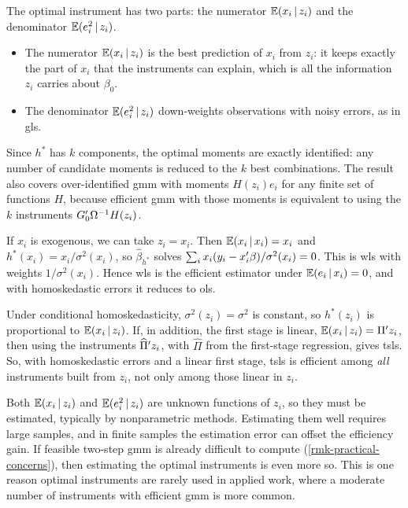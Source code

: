 \documentclass[a4paper,12pt]{article}
\begin{document}
\begin{remark}[Intuition]
	The optimal instrument has two parts: the numerator $\operatorname{\mathbb{E}}(x_i\mathpunct{}|\mathpunct{} z_i)$ and the denominator $\operatorname{\mathbb{E}}(e_i^2\mathpunct{}|\mathpunct{} z_i)$.
	\begin{itemize}
		\item
			The numerator $\operatorname{\mathbb{E}}(x_i\mathpunct{}|\mathpunct{} z_i)$ is the best prediction of $x_i$ from $z_i$:
			it keeps exactly the part of $x_i$ that the instruments can explain, which is all the information $z_i$ carries about $\beta_0$.
		\item
			The denominator $\operatorname{\mathbb{E}}(e_i^2\mathpunct{}|\mathpunct{} z_i)$ down-weights observations with noisy errors, as in \gls{gls}.
	\end{itemize}
	Since $h^*$ has $k$ components, the optimal moments are exactly identified:
	any number of candidate moments is reduced to the $k$ best combinations.
	The result also covers over-identified \gls{gmm} with moments $H(z_i)e_i$ for any finite set of functions $H$,
	because efficient \gls{gmm} with those moments is equivalent to using the $k$ instruments $G_0^{\prime}\Omega^{-1} H(z_i)$.
\end{remark}

\begin{remark}
	If $x_i$ is exogenous, we can take $z_i=x_i$.
	Then $\operatorname{\mathbb{E}}(x_i\mathpunct{}|\mathpunct{} x_i)=x_i$ and $h^*(x_i)=x_i/\sigma^2(x_i)$,
	so $\widehat\beta_{h^*}$ solves $\sum_ix_i(y_i-x_i^{\prime}\beta)/\sigma^2(x_i)=0$.
	This is \gls{wls} with weights $1/\sigma^2(x_i)$.
	Hence \gls{wls} is the efficient estimator under $\operatorname{\mathbb{E}}(e_i\mathpunct{}|\mathpunct{} x_i)=0$,
	and with homoskedastic errors it reduces to \gls{ols}.
\end{remark}

\begin{remark}
	Under conditional homoskedasticity, $\sigma^2(z_i)=\sigma^2$ is constant, so $h^*(z_i)$ is proportional to $\operatorname{\mathbb{E}}(x_i\mathpunct{}|\mathpunct{} z_i)$.
	If, in addition, the first stage is linear, $\operatorname{\mathbb{E}}(x_i\mathpunct{}|\mathpunct{} z_i)=\Pi^{\prime} z_i$,
	then using the instruments $\widehat\Pi^{\prime} z_i$, with $\widehat\Pi$ from the first-stage regression, gives \gls{tsls}.
	So, with homoskedastic errors and a linear first stage, \gls{tsls} is efficient among \emph{all} instruments built from $z_i$,
	not only among those linear in $z_i$.
\end{remark}

\begin{remark}[In Practice]
	Both $\operatorname{\mathbb{E}}(x_i\mathpunct{}|\mathpunct{} z_i)$ and $\operatorname{\mathbb{E}}(e_i^2\mathpunct{}|\mathpunct{} z_i)$ are unknown functions of $z_i$,
	so they must be estimated, typically by nonparametric methods.
	Estimating them well requires large samples, and in finite samples the estimation error can offset the efficiency gain.
	If feasible two-step \gls{gmm} is already difficult to compute (\autoref{rmk-practical-concerns}),
	then estimating the optimal instruments is even more so.
	This is one reason optimal instruments are rarely used in applied work,
	where a moderate number of instruments with efficient \gls{gmm} is more common.
\end{remark}
\end{document}
